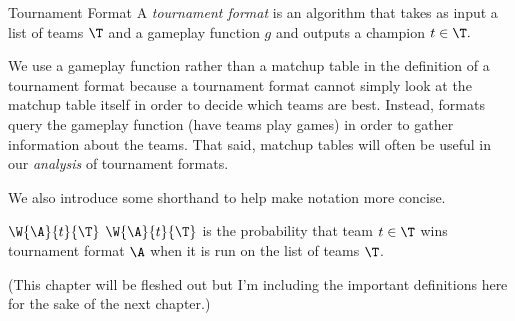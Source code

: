 {

\begin{definition}{Tournament Format}{}
    A \textit{tournament format} is an algorithm that takes as input a list of teams $\T$ and a gameplay function $g$ and outputs a champion $t \in \T.$
\end{definition}

We use a gameplay function rather than a matchup table in the definition of a tournament format because a tournament format cannot simply look at the matchup table itself in order to decide which teams are best. Instead, formats query the gameplay function (have teams play games) in order to gather information about the teams. That said, matchup tables will often be useful in our \textit{analysis} of tournament formats. 

We also introduce some shorthand to help make notation more concise.

\begin{definition}{$\W{\A}{t}{\T}$}{}
    $\W{\A}{t}{\T}$ is the probability that team $t \in \T$ wins tournament format $\A$ when it is run on the list of teams $\T$.
\end{definition}



(This chapter will be fleshed out but I'm including the important definitions here for the sake of the next chapter.)
}